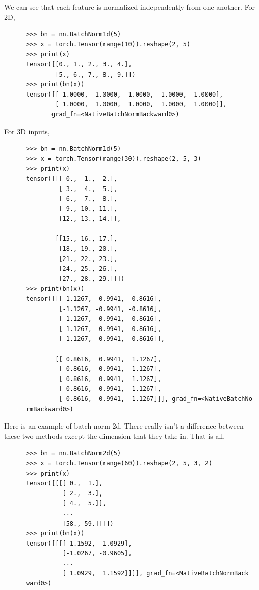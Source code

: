   \begin{example}
    We can see that each feature is normalized independently from one another. For 2D, 
    \begin{lstlisting}
      >>> bn = nn.BatchNorm1d(5)
      >>> x = torch.Tensor(range(10)).reshape(2, 5)
      >>> print(x) 
      tensor([[0., 1., 2., 3., 4.],
              [5., 6., 7., 8., 9.]])
      >>> print(bn(x))
      tensor([[-1.0000, -1.0000, -1.0000, -1.0000, -1.0000],
              [ 1.0000,  1.0000,  1.0000,  1.0000,  1.0000]],
             grad_fn=<NativeBatchNormBackward0>)
    \end{lstlisting}
    For 3D inputs, 
    \begin{lstlisting}
      >>> bn = nn.BatchNorm1d(5)
      >>> x = torch.Tensor(range(30)).reshape(2, 5, 3)
      >>> print(x) 
      tensor([[[ 0.,  1.,  2.],
               [ 3.,  4.,  5.],
               [ 6.,  7.,  8.],
               [ 9., 10., 11.],
               [12., 13., 14.]],

              [[15., 16., 17.],
               [18., 19., 20.],
               [21., 22., 23.],
               [24., 25., 26.],
               [27., 28., 29.]]])
      >>> print(bn(x))
      tensor([[[-1.1267, -0.9941, -0.8616],
               [-1.1267, -0.9941, -0.8616],
               [-1.1267, -0.9941, -0.8616],
               [-1.1267, -0.9941, -0.8616],
               [-1.1267, -0.9941, -0.8616]],

              [[ 0.8616,  0.9941,  1.1267],
               [ 0.8616,  0.9941,  1.1267],
               [ 0.8616,  0.9941,  1.1267],
               [ 0.8616,  0.9941,  1.1267],
               [ 0.8616,  0.9941,  1.1267]]], grad_fn=<NativeBatchNo
      rmBackward0>)
    \end{lstlisting}
  \end{example}

  \begin{example}
    Here is an example of batch norm 2d. There really isn't a difference between these two methods except the dimension that they take in. That is all. 
    \begin{lstlisting}
      >>> bn = nn.BatchNorm2d(5)
      >>> x = torch.Tensor(range(60)).reshape(2, 5, 3, 2)
      >>> print(x) 
      tensor([[[[ 0.,  1.],
                [ 2.,  3.],
                [ 4.,  5.]],
                ...
                [58., 59.]]]])
      >>> print(bn(x))
      tensor([[[[-1.1592, -1.0929],
                [-1.0267, -0.9605],
                ...
                [ 1.0929,  1.1592]]]], grad_fn=<NativeBatchNormBack
      ward0>)
    \end{lstlisting}
  \end{example}

